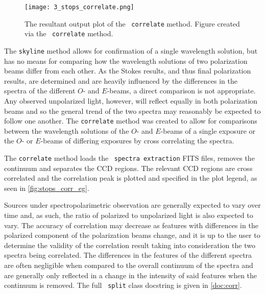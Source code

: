 

\begin{figure}[t]
    \centering
    \texttt{[image: 3\_stops\_correlate.png]}
    \caption{The resultant output plot of the \stops\ \texttt{correlate} method. Figure created via the \stops\ \texttt{correlate} method.}
    \label{fig:stops_corr_eg}
\end{figure}

The \texttt{skyline} method allows for confirmation of a single wavelength solution, but has no means for comparing how the wavelength solutions of two polarization beams differ from each other. As the Stokes results, and thus final polarization results, are determined and are heavily influenced by the differences in the spectra of the different $O$- and $E$-beams, a direct comparison is not appropriate. Any observed unpolarized light, however, will reflect equally in both polarization beams and so the general trend of the two spectra may reasonably be expected to follow one another. The \texttt{correlate} method was created to allow for comparisons between the wavelength solutions of the $O$- and $E$-beams of a single exposure or the $O$- or $E$-beams of differing exposures by cross correlating the spectra.

The \texttt{correlate} method loads the \polsalt\ \texttt{spectra extraction} \gls{FITS} files, removes the continuum and separates the \gls{CCD} regions. The relevant \gls{CCD} regions are cross correlated and the correlation peak is plotted and specified in the plot legend, as seen in \autoref{fig:stops_corr_eg}.

Sources under spectropolarimetric observation are generally expected to vary over time and, as such, the ratio of polarized to unpolarized light is also expected to vary. The accuracy of correlation may decrease as features with differences in the polarized component of the polarization beams change, and it is up to the user to determine the validity of the correlation result taking into consideration the two spectra being correlated. The differences in the features of the different spectra are often negligible when compared to the overall continuum of the spectra and are generally only reflected in a change in the intensity of said features when the continuum is removed.
The full \stops\ \texttt{split} class docstring is given in \autoref{doc:corr}.

